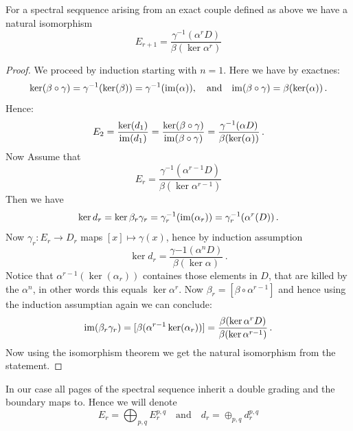 \begin{corollary}\label{cor: explicit pages of exact sequences arising from exact couples}
	For a spectral seqquence arising from an exact couple defined as above we have a natural isomorphism
	\begin{equation*}
		E_{r+1}= \frac{\gamma^{-1}(\alpha^r D)}{\beta(\ker \alpha ^r)}
	\end{equation*}
\end{corollary}
\begin{proof}
	We proceed by induction starting with $n=1$.
	Here we have by exactnes:
	\begin{equation*}
		\ker(\beta \circ \gamma)=\gamma^{-1}(\ker(\beta))=\gamma^{-1}(\mathrm{im}(\alpha)),\quad \text{and}\quad
		\mathrm{im}(\beta\circ \gamma)=\beta(\ker(\alpha))\,.
	\end{equation*}
	Hence:
	\begin{equation*}
		E_2=\frac{\ker(d_1)}{\mathrm{im}(d_1)}=\frac{\ker(\beta\circ \gamma)}{\mathrm{im}(\beta \circ \gamma)}=\frac{\gamma^{-1}(\alpha D)}{\beta(\ker(\alpha))}\,.
	\end{equation*}
	Now Assume that
	\begin{equation*}
		E_r=\frac{\gamma^{-1}(\alpha^{r-1}D)}{\beta(\ker \alpha^{r-1})}
	\end{equation*}
	Then we have
	\begin{equation*}
		\ker{d_r}=\ker{\beta_r\gamma_r}=\gamma_r^{-1}(\mathrm{im}(\alpha_r))=\gamma_r^{-1}(\alpha^r(D))\,.
	\end{equation*} Now $\gamma_r:E_r\to D_r$ maps $[x]\mapsto \gamma(x)$, hence by induction assumption
	\begin{equation*}
		\ker{d_r}=\frac{\gamma{-1}(\alpha^nD)}{\beta(\ker \alpha)}\,.
	\end{equation*} Notice that $\alpha^{r-1}(\ker(\alpha_r))$ containes those elements in $D$, that are killed by the $\alpha^n$, in other words this equals $\ker \alpha^r$. Now $\beta_r=[\beta\circ \alpha^{r-1}]$ and hence using the induction assumptian again we can conclude:
	\begin{equation*}
		\mathrm{im}(\beta_r\gamma_r)=[\beta(\alpha^{r-1}\ker(\alpha_r))]=\frac{\beta(\ker\alpha^r D)}{\beta(\ker \alpha^{r-1})}\,.
	\end{equation*} Now using the isomorphism theorem we get the natural isomorphism from the statement.
\end{proof}
\begin{definition}
	In our case all pages of the spectral sequence inherit a double grading and the boundary maps to. Hence we will denote
	\begin{equation*}
		E_r=\bigoplus_{p,q}E_r^{p,q}\quad \text{and} \quad d_r=\oplus_{p,q}d_r^{p,q}
	\end{equation*}
\end{definition}
